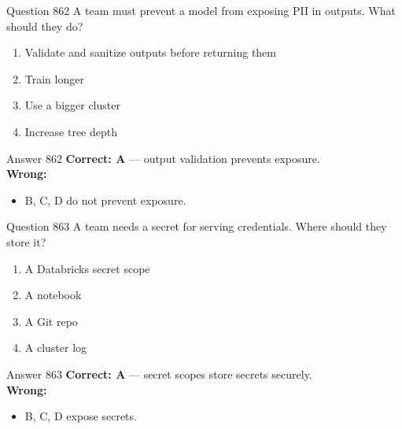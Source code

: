 \documentclass[aspectratio=169,11pt]{beamer}
\begin{document}
	\begin{frame}{Question 862}
		A team must prevent a model from exposing PII in outputs. What should they do?
		\begin{enumerate}[label=\Alph*.]
			\item Validate and sanitize outputs before returning them
			\item Train longer
			\item Use a bigger cluster
			\item Increase tree depth
		\end{enumerate}
	\end{frame}
	\begin{frame}{Answer 862}
		\textbf{Correct: A} --- output validation prevents exposure.\\
		\vspace{0.5em}
		\textbf{Wrong:}
		\begin{itemize}
			\item B, C, D do not prevent exposure.
		\end{itemize}
	\end{frame}
	
	\begin{frame}{Question 863}
		A team needs a secret for serving credentials. Where should they store it?
		\begin{enumerate}[label=\Alph*.]
			\item A Databricks secret scope
			\item A notebook
			\item A Git repo
			\item A cluster log
		\end{enumerate}
	\end{frame}
	\begin{frame}{Answer 863}
		\textbf{Correct: A} --- secret scopes store secrets securely.\\
		\vspace{0.5em}
		\textbf{Wrong:}
		\begin{itemize}
			\item B, C, D expose secrets.
		\end{itemize}
	\end{frame}
	
\end{document}
